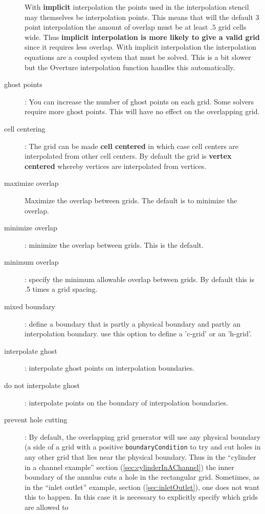 \begin{description}
     With {\bf implicit} interpolation the points used in the interpolation
     stencil may themselves be interpolation points. This means  
     that will the default 3 point interpolation the amount of overlap must be at least
     $.5$ grid cells wide. Thus {\bf implicit interpolation is more likely to give a valid grid} since
     it requires less overlap. With implicit interpolation the interpolation equations are a coupled
     system that must be solved. This is a bit slower but the Overture interpolation function handles
     this automatically.
  \item[ghost points] : You can increase the number of ghost points on each grid. Some solvers require
      more ghost points. This will have no effect on the overlapping grid.
  \item[cell centering] : The grid can be made {\bf cell centered} in which case cell centers are
      interpolated from other cell centers. By default the grid is {\bf vertex centered} whereby vertices
      are interpolated from vertices.
  \item[maximize overlap] Maximize the overlap between grids. The default is to minimize the overlap.
  \item[minimize overlap] : minimize the overlap between grids. This is the default.
  \item[minimum overlap] : specify the minimum allowable overlap between grids. By default this is .5
       times a grid spacing. 
  \item[mixed boundary] : define a boundary that is partly a physical boundary and partly an interpolation
     boundary. use this option to define a 'c-grid' or an 'h-grid'.
  \item[interpolate ghost] : interpolate ghost points on interpolation boundaries.
  \item[do not interpolate ghost] : interpolate points on the boundary of interpolation boundaries.
  \item[prevent hole cutting] : By default, the overlapping grid
      generator will use any physical boundary (a side of a grid with a
      positive {\tt boundaryCondition} to try and cut holes in any other
      grid that lies near the physical boundary. Thus in the ``cylinder in a
      channel example'' section (\ref{sec:cylinderInAChannel}) the inner
      boundary of the annulus cuts a hole in the rectangular grid.
      Sometimes, as in the ``inlet outlet'' example, section
      (\ref{sec:inletOutlet}), one does not want this to happen. In this
      case it is necessary to explicitly specify which grids are allowed to

\end{description}
